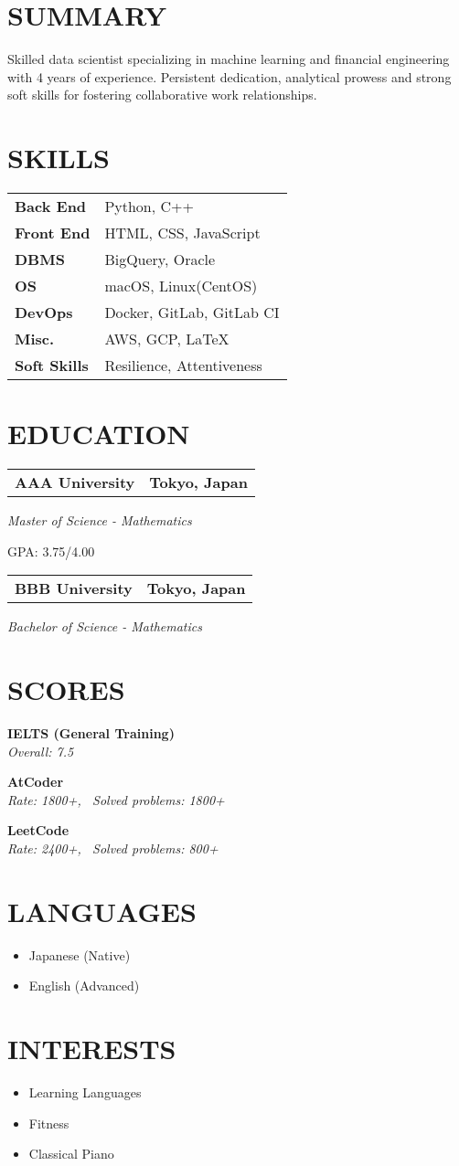 \documentclass[11pt,a4paper]{moderncv}
\newcommand*{\educationentry}[4][0.5mm]{
    \begin{tabularx}{\textwidth}{LR}
        {\bfseries #3} & {\bfseries #4} \\
    \end{tabularx}
    {\itshape #2}
    \par\addvspace{#1}
}
\newcommand*{\scoreentry}[3][2.5mm]{
    {\bfseries #2} \\
    {\itshape #3}
    \par\addvspace{#1}
}
\begin{document}
\begin{minipage}[t]{0.35\textwidth}
\section{SUMMARY}
Skilled data scientist specializing in machine learning and financial engineering with 4 years of experience. Persistent dedication, analytical prowess and strong soft skills for fostering collaborative work relationships.

\section{SKILLS}
\begin{tabularx}{\textwidth}{>{\bfseries}l@{\hskip 3.5mm}L}
Back End & Python, C++ \\
Front End & HTML, CSS, JavaScript \\
DBMS & BigQuery, Oracle \\
OS & macOS, Linux(CentOS) \\
DevOps & Docker, GitLab, GitLab CI \\
Misc. & AWS, GCP, \LaTeX \\
Soft Skills & Resilience, Attentiveness
\end{tabularx}

\section{EDUCATION}
\educationentry{Master of Science - Mathematics}{AAA University}{Tokyo, Japan}
GPA: 3.75/4.00
\par
\vspace{3.0mm}
\educationentry{Bachelor of Science - Mathematics}{BBB University}{Tokyo, Japan}

\section{SCORES}
\scoreentry{IELTS (General Training)}{Overall: 7.5}
\scoreentry{AtCoder}{Rate: 1800+, \, Solved problems: 1800+}
\scoreentry{LeetCode}{Rate: 2400+, \, Solved problems: 800+}

\section{LANGUAGES}
\begin{itemize}
    \item Japanese (Native)
    \item English (Advanced)
\end{itemize}

\section{INTERESTS}
\begin{itemize}
    \item Learning Languages
    \item Fitness
    \item Classical Piano
\end{itemize}
\end{minipage}
\end{document}
